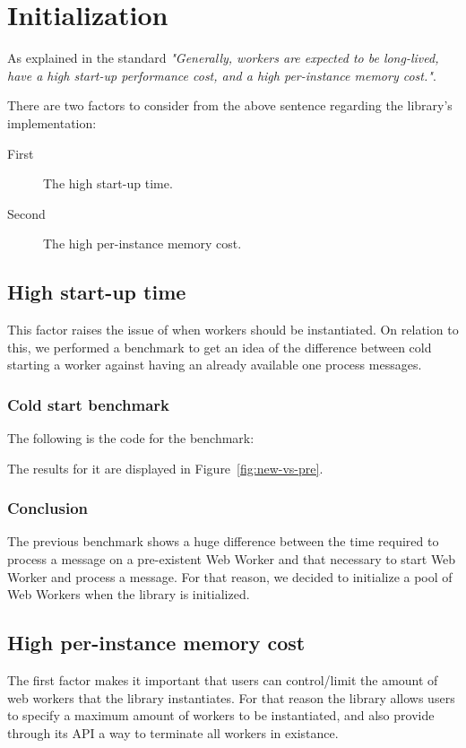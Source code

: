 \section{Initialization}

As explained in the standard \cite{w3c-ww} \textit{"Generally, workers are expected to be long-lived, have a high start-up performance cost, and a high per-instance memory cost."}.

There are two factors to consider from the above sentence regarding the library's implementation:

\begin{description}
\item[First] The high start-up time.
\item[Second] The high per-instance memory cost.
\end{description}

\subsection{High start-up time}
This factor raises the issue of when workers should be instantiated. On relation to this, we performed a benchmark to get an idea of the difference between cold starting a worker against having an already available one process messages.

\subsubsection{Cold start benchmark}
The following is the code for the benchmark:

The results for it are displayed in Figure~\ref{fig:new-vs-pre}.

\subsubsection{Conclusion}
The previous benchmark shows a huge difference between the time required to process a message on a pre-existent Web Worker and that necessary to start Web Worker and process a message. For that reason, we decided to initialize a pool of Web Workers when the library is initialized.

\subsection{High per-instance memory cost}
The first factor makes it important that users can control/limit the amount of web workers that the library instantiates. For that reason the library allows users to specify a maximum amount of workers to be instantiated, and also provide through its API a way to terminate all workers in existance.

